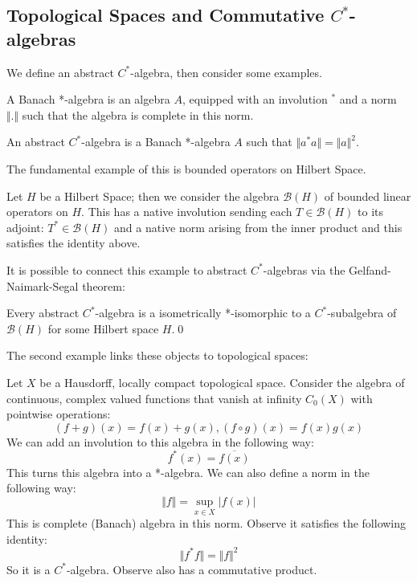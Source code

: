 \subsection{Topological Spaces and Commutative $C^{*}$-algebras}

We define an abstract $C^{*}$-algebra, then consider some examples.

\begin{definition}
A Banach *-algebra is an algebra $A$, equipped with an involution $^{*}$ and a norm $\Vert . \Vert$ such that the algebra is complete in this norm.
\end{definition}

\begin{definition}
An abstract $C^{*}$-algebra is a Banach *-algebra $A$ such that $\Vert a^{*}a \Vert = \Vert a \Vert^{2}$.
\end{definition}

The fundamental example of this is bounded operators on Hilbert Space.

\begin{example}
Let $H$ be a Hilbert Space; then we consider the algebra $\mathcal{B}(H)$ of bounded linear operators on $H$. This has a native involution sending each $T \in \mathcal{B}(H)$ to its adjoint: $T^{*} \in \mathcal{B}(H)$ and a native norm arising from the inner product and this satisfies the identity above.
\end{example}

It is possible to connect this example to abstract $C^{*}$-algebras via the Gelfand-Naimark-Segal theorem:

\begin{theorem}
Every abstract $C^{*}$-algebra is a isometrically *-isomorphic to a $C^{*}$-subalgebra of $\mathcal{B}(H)$ for some Hilbert space $H$.\qed
\end{theorem}

The second example links these objects to topological spaces:

\begin{example}
Let $X$ be a Hausdorff, locally compact topological space. Consider the algebra of continuous, complex valued functions that vanish at infinity $C_{0}(X)$ with pointwise operations:
\begin{equation*}
(f+g)(x)=f(x)+g(x), (f\circ g)(x)=f(x)g(x)
\end{equation*}
We can add an involution to this algebra in the following way:
\begin{equation*}
f^{*}(x)=\overline{f(x)}
\end{equation*}
This turns this algebra into a *-algebra. We can also define a norm in the following way:
\begin{equation*}
\Vert f \Vert = \sup_{x \in X} \vert f(x) \vert
\end{equation*}
This is complete (Banach) algebra in this norm. Observe it satisfies the following identity:
\begin{equation*}
\Vert f^{*}f \Vert = \Vert f \Vert^{2}
\end{equation*}
So it is a $C^{*}$-algebra. Observe also has a commutative product.
\end{example}

